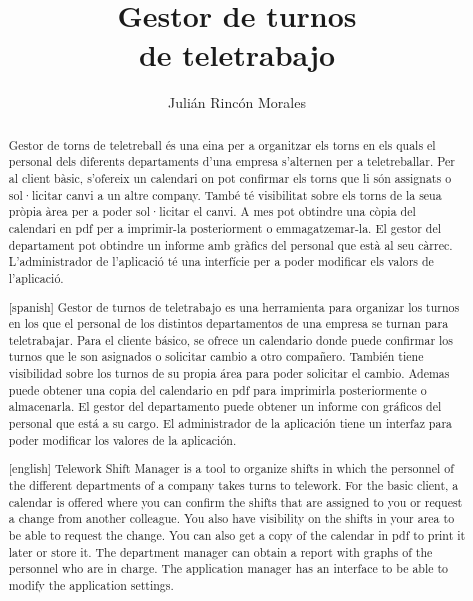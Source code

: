\documentclass[11pt,spanish,listoffigures,listoftables]{tfgetsinf}
\title{Gestor de turnos  \\
         de teletrabajo}
\author{Julián Rincón Morales}
\begin{document}

\begin{abstract}
Gestor de torns de teletreball és una eina per a organitzar els torns en els quals el personal dels diferents departaments d'una empresa s'alternen per a teletreballar.
Per al client bàsic, s'ofereix un calendari on pot confirmar els torns que li són assignats o sol·licitar canvi a un altre company.
També té visibilitat sobre els torns de la seua pròpia àrea per a poder sol·licitar el canvi.
A mes pot obtindre una còpia del calendari en pdf per a imprimir-la posteriorment o emmagatzemar-la.
El gestor del departament pot obtindre un informe amb gràfics del personal que està al seu càrrec.
L'administrador de l'aplicació té una interfície per a poder modificar els valors de l'aplicació.
\end{abstract}
\begin{abstract}[spanish]
Gestor de turnos de teletrabajo es una herramienta para organizar los turnos en los que el personal de los distintos departamentos de una empresa se turnan para teletrabajar.
Para el cliente básico, se ofrece un calendario donde puede confirmar los turnos que le son asignados o solicitar cambio a otro compañero.
También tiene visibilidad sobre los turnos de su propia área para poder solicitar el cambio.
Ademas puede obtener una copia del calendario en pdf para imprimirla posteriormente o almacenarla.
El gestor del departamento puede obtener un informe con gráficos del personal que está a su cargo.
El administrador de la aplicación tiene un interfaz para poder modificar los valores de la aplicación.
\end{abstract}
\begin{abstract}[english]
Telework Shift Manager is a tool to organize shifts in which the personnel of the different departments of a company takes turns to telework.
For the basic client, a calendar is offered where you can confirm the shifts that are assigned to you or request a change from another colleague.
You also have visibility on the shifts in your area to be able to request the change.
You can also get a copy of the calendar in pdf to print it later or store it.
The department manager can obtain a report with graphs of the personnel who are in charge.
The application manager has an interface to be able to modify the application settings.
\end{abstract}
\end{document}
